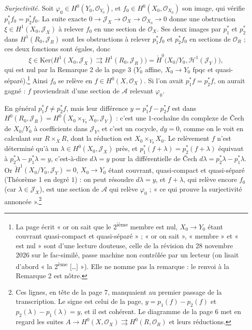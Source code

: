 \documentclass[11pt,a4paper]{article}
\begin{document}
\emph{Surjectivité.} Soit $\varphi_0 \in H^0(Y_0, \mathcal{O}_{Y_0})$, et
$f_0 \in H^0(X_0, \mathcal{O}_{X_0})$ son image, qui vérifie $p_1^{*}f_0 =
p_2^{*}f_0$. La suite exacte $0 \to \mathcal{J}_X \to \mathcal{O}_X \to
\mathcal{O}_{X_0} \to 0$ donne une obstruction $\xi \in H^1(X_0,
\mathcal{J}_X)$ à relever $f_0$ en une section de $\mathcal{O}_X$. Ses deux
images par $p_1^{*}$ et $p_2^{*}$ dans $H^1(R_0, \mathcal{J}_R)$ sont les
obstructions à relever $p_1^{*}f_0$ et $p_2^{*}f_0$ en sections de
$\mathcal{O}_R$ ; ces deux fonctions sont égales, donc
\[
  \xi \in \mathrm{Ker}\bigl(H^1(X_0, \mathcal{J}_X) \rightrightarrows
  H^1(R_0, \mathcal{J}_R)\bigr)
  = \check{H}^0\bigl(X_0/Y_0, \mathcal{H}^1(\mathcal{J}_Y)\bigr) ,
\]
qui est nul par la Remarque 2 de la page 3 ($Y_0$ affine, $X_0 \to Y_0$ fpqc et
quasi-séparé).\footnote{La page écrit « or on sait que le
2\textsuperscript{ième} membre est nul, $X_0 \to Y_0$ étant couvrant quasi-compact
et quasi-séparé » ; « or on sait », « membre » et « est nul » sont d'une lecture
douteuse, celle de la révision du 28 novembre 2026 sur le fac-similé, passe machine non contrôlée par un lecteur (on lisait d'abord « la 2\textsuperscript{ème} […] »).
Elle ne nomme pas la remarque : le renvoi à la Remarque 2 est nôtre.} Ainsi $f_0$ se relève en $f \in
H^0(X, \mathcal{O}_X)$. Si l'on avait $p_1^{*}f = p_2^{*}f$, on aurait gagné :
$f$ proviendrait d'une section de $\mathcal{A}$ relevant $\varphi_0$.

En général $p_1^{*}f \neq p_2^{*}f$, mais leur différence $y = p_1^{*}f -
p_2^{*}f$ est dans $H^0(R_0, \mathcal{J}_R) = H^0(X_0 \times_{Y_0} X_0,
\mathcal{J}_Y)$ : c'est une $1$-cochaîne du complexe de Čech de $X_0/Y_0$ à
coefficients dans $\mathcal{J}_Y$, et c'est un cocycle, $dy = 0$, comme on le
voit en calculant sur $R \times_X R$, dont la réduction est $X_0 \times_{Y_0}
X_0$. Le relèvement $f$ n'est déterminé qu'à un $\lambda \in H^0(X_0,
\mathcal{J}_X)$ près, et $p_1^{*}(f + \lambda) = p_2^{*}(f + \lambda)$ équivaut à
$p_2^{*}\lambda - p_1^{*}\lambda = y$, c'est-à-dire $d\lambda = y$ pour la
différentielle de Čech $d\lambda = p_2^{*}\lambda - p_1^{*}\lambda$. Or
$\check{H}^1(X_0/Y_0, \mathcal{J}_Y) = 0$, $X_0 \to Y_0$ étant couvrant,
quasi-compact et quasi-séparé (Théorème 1 en degré $1$) : on peut résoudre
$d\lambda = y$, et $f + \lambda$, qui relève encore $f_0$ (car $\lambda \in
\mathcal{J}_X$), est une section de $\mathcal{A}$ qui relève $\varphi_0$ ;
« ce qui prouve la surjectivité annoncée ».\footnote{Ces lignes, en tête de la
page 7, manquaient au premier passage de la transcription. Le signe est celui
de la page, $y = p_1(f) - p_2(f)$ et $p_2(\lambda) - p_1(\lambda) = y$, et il
est cohérent. Le diagramme de la page 6 met en regard les suites $A \to H^0(X,
\mathcal{O}_X) \rightrightarrows H^0(R, \mathcal{O}_R)$ et leurs réductions.}
\end{document}
